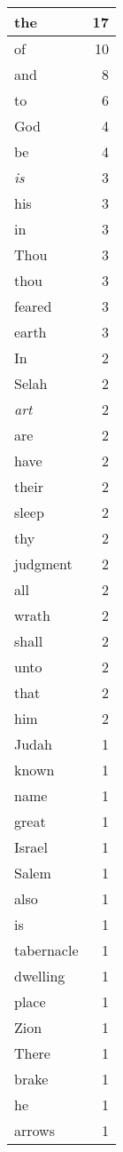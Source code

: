 \begin{center}
\begin{longtable}{l|r}
\hline \hline
\endlastfoot
the & 17 \\ \hline
of & 10 \\ \hline
and & 8 \\ \hline
to & 6 \\ \hline
God & 4 \\ \hline
be & 4 \\ \hline
\emph{is} & 3 \\ \hline
his & 3 \\ \hline
in & 3 \\ \hline
Thou & 3 \\ \hline
thou & 3 \\ \hline
feared & 3 \\ \hline
earth & 3 \\ \hline
In & 2 \\ \hline
Selah & 2 \\ \hline
\emph{art} & 2 \\ \hline
are & 2 \\ \hline
have & 2 \\ \hline
their & 2 \\ \hline
sleep & 2 \\ \hline
thy & 2 \\ \hline
judgment & 2 \\ \hline
all & 2 \\ \hline
wrath & 2 \\ \hline
shall & 2 \\ \hline
unto & 2 \\ \hline
that & 2 \\ \hline
him & 2 \\ \hline
Judah & 1 \\ \hline
known & 1 \\ \hline
name & 1 \\ \hline
great & 1 \\ \hline
Israel & 1 \\ \hline
Salem & 1 \\ \hline
also & 1 \\ \hline
is & 1 \\ \hline
tabernacle & 1 \\ \hline
dwelling & 1 \\ \hline
place & 1 \\ \hline
Zion & 1 \\ \hline
There & 1 \\ \hline
brake & 1 \\ \hline
he & 1 \\ \hline
arrows & 1 \\ \hline

\end{longtable}
\end{center}
